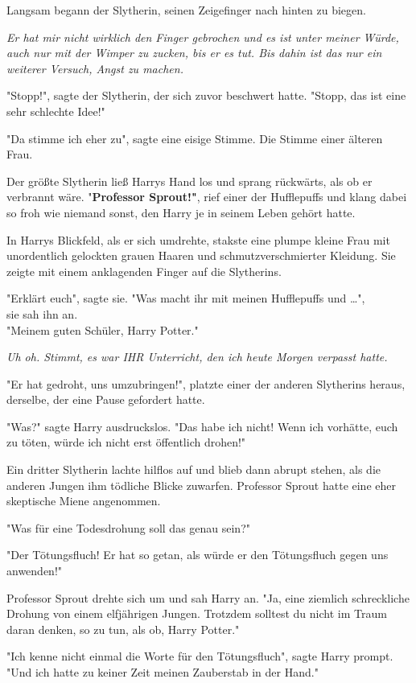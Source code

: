 {Langsam begann der Slytherin, seinen Zeigefinger nach hinten zu biegen.

\emph{Er hat mir nicht wirklich den Finger gebrochen und es ist unter meiner Würde, auch nur mit der Wimper zu zucken, bis er es tut. Bis dahin ist das nur ein weiterer Versuch, Angst zu machen.}

"Stopp!", sagte der Slytherin, der sich zuvor beschwert hatte. "Stopp, das ist eine sehr schlechte Idee!"

"Da stimme ich eher zu", sagte eine eisige Stimme. Die Stimme einer älteren Frau.

Der größte Slytherin ließ Harrys Hand los und sprang rückwärts, als ob er verbrannt wäre. "\textbf{Professor Sprout!"}, rief einer der Hufflepuffs und klang dabei so froh wie niemand sonst, den Harry je in seinem Leben gehört hatte.

In Harrys Blickfeld, als er sich umdrehte, stakste eine plumpe kleine Frau mit unordentlich gelockten grauen Haaren und schmutzverschmierter Kleidung. Sie zeigte mit einem anklagenden Finger auf die Slytherins.

"Erklärt euch", sagte sie. "Was macht ihr mit meinen Hufflepuffs und …",\\ sie sah ihn an.\\ "Meinem guten Schüler, Harry Potter."

\emph{Uh oh. Stimmt, es war IHR Unterricht, den ich heute Morgen verpasst hatte.}

"Er hat gedroht, uns umzubringen!", platzte einer der anderen Slytherins heraus, derselbe, der eine Pause gefordert hatte.

"Was?" sagte Harry ausdruckslos. "Das habe ich nicht! Wenn ich vorhätte, euch zu töten, würde ich nicht erst öffentlich drohen!"

Ein dritter Slytherin lachte hilflos auf und blieb dann abrupt stehen, als die anderen Jungen ihm tödliche Blicke zuwarfen. Professor Sprout hatte eine eher skeptische Miene angenommen.

"Was für eine Todesdrohung soll das genau sein?"

"Der Tötungsfluch! Er hat so getan, als würde er den Tötungsfluch gegen uns anwenden!"

Professor Sprout drehte sich um und sah Harry an. "Ja, eine ziemlich schreckliche Drohung von einem elfjährigen Jungen. Trotzdem solltest du nicht im Traum daran denken, so zu tun, als ob, Harry Potter."

"Ich kenne nicht einmal die Worte für den Tötungsfluch", sagte Harry prompt. "Und ich hatte zu keiner Zeit meinen Zauberstab in der Hand."

}
